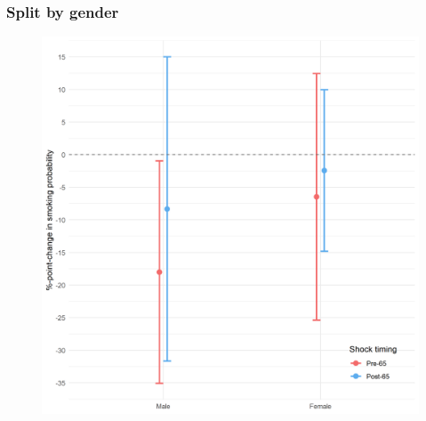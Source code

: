 \documentclass[10pt,compress,xcolor=dvipsnames]{beamer}    %
\newcounter{ex}
\newcommand{\1}[1]{\mathrm{1\hspace*{-2.5pt}l}[#1]}	%
\begin{document}
\begin{frame}
\frametitle{Split by gender}

\begin{figure}[hbtp]
\centering
\includegraphics[height=0.8\textheight]{../../3_output/shock_effects/female_6070_100_cvplot.png}
\label{fig:female}
\end{figure}
\hyperlink{frame:otherX}{}
\end{frame}
\end{document}
